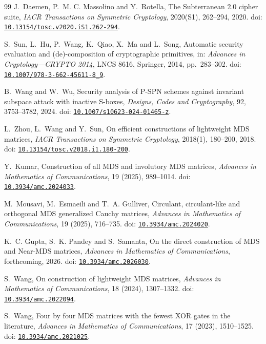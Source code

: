 \documentclass[10pt,reqno]{amsart}
\theoremstyle{plain}
\theoremstyle{remark}\newtheorem{remark}[theorem]{Remark}
\theoremstyle{definition}\newtheorem{definition}[theorem]{Definition}
\begin{document}
\begin{thebibliography}{99}
J.~Daemen, P.~M. C. Massolino and Y.~Rotella,
The Subterranean 2.0 cipher suite,
\emph{IACR Transactions on Symmetric Cryptology},
2020(S1), 262--294, 2020. doi: \href{https://doi.org/10.13154/tosc.v2020.iS1.262-294}{\nolinkurl{10.13154/tosc.v2020.iS1.262-294}}.

S.~Sun, L.~Hu, P.~Wang, K.~Qiao, X.~Ma and L.~Song,
Automatic security evaluation and (de)-composition of cryptographic
primitives,
in: \emph{Advances in Cryptology---CRYPTO 2014},
LNCS 8616, Springer, 2014, pp.~283--302. doi: \href{https://doi.org/10.1007/978-3-662-45611-8_9}{\nolinkurl{10.1007/978-3-662-45611-8_9}}.

B.~Wang and W.~Wu,
Security analysis of P-SPN schemes against invariant subspace attack
with inactive S-boxes,
\emph{Designs, Codes and Cryptography},
92, 3753--3782, 2024. doi: \href{https://doi.org/10.1007/s10623-024-01465-z}{\nolinkurl{10.1007/s10623-024-01465-z}}.

L.~Zhou, L.~Wang and Y.~Sun,
On efficient constructions of lightweight MDS matrices,
\emph{IACR Transactions on Symmetric Cryptology},
2018(1), 180--200, 2018. doi: \href{https://doi.org/10.13154/tosc.v2018.i1.180-200}{\nolinkurl{10.13154/tosc.v2018.i1.180-200}}.


Y.~Kumar,
Construction of all MDS and involutory MDS matrices,
\emph{Advances in Mathematics of Communications}, 19 (2025), 989--1014.
doi: \href{https://doi.org/10.3934/amc.2024033}{\nolinkurl{10.3934/amc.2024033}}.

M.~Mousavi, M.~Esmaeili and T.~A. Gulliver,
Circulant, circulant-like and orthogonal MDS generalized Cauchy matrices,
\emph{Advances in Mathematics of Communications}, 19 (2025), 716--735.
doi: \href{https://doi.org/10.3934/amc.2024020}{\nolinkurl{10.3934/amc.2024020}}.

K.~C. Gupta, S.~K. Pandey and S.~Samanta,
On the direct construction of MDS and Near-MDS matrices,
\emph{Advances in Mathematics of Communications}, forthcoming, 2026.
doi: \href{https://doi.org/10.3934/amc.2026030}{\nolinkurl{10.3934/amc.2026030}}.

S.~Wang,
On construction of lightweight MDS matrices,
\emph{Advances in Mathematics of Communications}, 18 (2024), 1307--1332.
doi: \href{https://doi.org/10.3934/amc.2022094}{\nolinkurl{10.3934/amc.2022094}}.

S.~Wang,
Four by four MDS matrices with the fewest XOR gates in the literature,
\emph{Advances in Mathematics of Communications}, 17 (2023), 1510--1525.
doi: \href{https://doi.org/10.3934/amc.2021025}{\nolinkurl{10.3934/amc.2021025}}.

\end{thebibliography}
\end{document}
